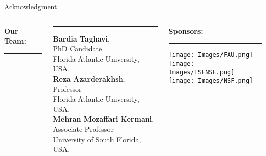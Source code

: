\documentclass[
	10pt, t,
	hyperref={
		colorlinks,
		citecolor=CtpLatteTeal,
		linkcolor=CtpLatteTeal,
		urlcolor=CtpLatteBlue,
		pdfauthor={Bardia Taghavi},
		pdftitle={LightNTT: A Tiny NTT/iNTT Core for ML-DSA Featuring a Constant-Geometry Pipelined Design},
		pdfsubject={Cryptography},
		pdfkeywords={NTT, iNTT, ML-DSA, Constant-Geometry Pipelined Design},
		pdfcreator={Bardia Taghavi},
		pdfproducer={Bardia Taghavi}
		},
	aspectratio=1610,
	]
	{beamer}
\begin{document}
\begin{frame}{Acknowledgment}
	\begin{columns}[T]
		\hspace{2em}
		\begin{column}{0.16\textwidth}
			\textcolor{CtpLatteRed}{\large\textbf{Our Team:}}\\[1em]
			\hrule
			\vspace{-3ex}
			\vspace{-3ex}
		\end{column}
		\begin{column}{0.5\textwidth}
			\vspace{1.8em}
			\hrule
			\vspace{1.1em}
			\textbf{Bardia Taghavi},\\ PhD Candidate\\Florida Atlantic University, USA.\\[3.1em]
			\textbf{Reza Azarderakhsh},\\ Professor\\Florida Atlantic University, USA.\\[3.1em]
			\textbf{Mehran Mozaffari Kermani},\\ Associate Professor\\University of South Florida, USA.\\
		\end{column}
		\begin{column}{0.3\textwidth}
			\textcolor{CtpLatteRed}{\large\textbf{Sponsors:}}\\[.7em]
			\hrule\vspace{1em}
			\texttt{[image: Images/FAU.png]}\\[1em]
			\texttt{[image: Images/ISENSE.png]}\\[1em]
			\texttt{[image: Images/NSF.png]}

		\end{column}

	\end{columns}

\end{frame}


% 
% 
\end{document}
